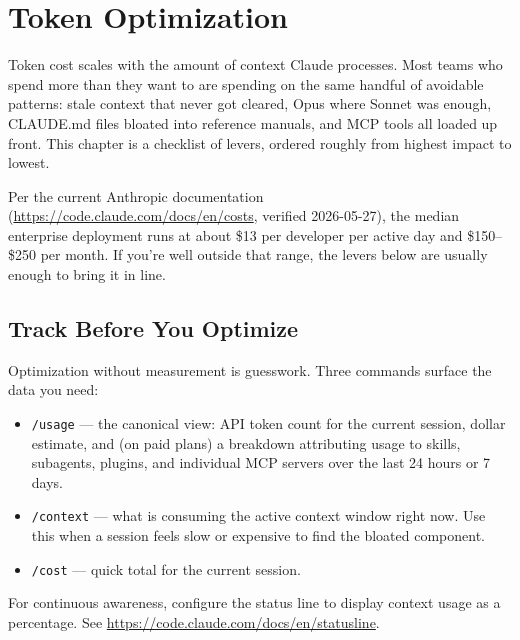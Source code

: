 \chapter{Token Optimization}
\label{ch:optimization}


Token cost scales with the amount of context Claude processes. Most teams who
spend more than they want to are spending on the same handful of avoidable
patterns: stale context that never got cleared, Opus where Sonnet was enough,
CLAUDE.md files bloated into reference manuals, and MCP tools all loaded up
front. This chapter is a checklist of levers, ordered roughly from highest
impact to lowest.

\begin{warningbox}
Per the current Anthropic documentation
(\url{https://code.claude.com/docs/en/costs}, verified 2026-05-27), the
median enterprise deployment runs at about \$13 per developer per active
day and \$150--\$250 per month. If you're well outside that range, the
levers below are usually enough to bring it in line.
\end{warningbox}

\section{Track Before You Optimize}
\label{sec:cost-track}


Optimization without measurement is guesswork. Three commands surface the
data you need:

\begin{itemize}
  \item \texttt{/usage} — the canonical view: API token count for the
        current session, dollar estimate, and (on paid plans) a breakdown
        attributing usage to skills, subagents, plugins, and individual
        MCP servers over the last 24 hours or 7 days.
  \item \texttt{/context} — what is consuming the active context window
        right now. Use this when a session feels slow or expensive to find
        the bloated component.
  \item \texttt{/cost} — quick total for the current session.
\end{itemize}

For continuous awareness, configure the status line to display context
usage as a percentage. See
\url{https://code.claude.com/docs/en/statusline}.

